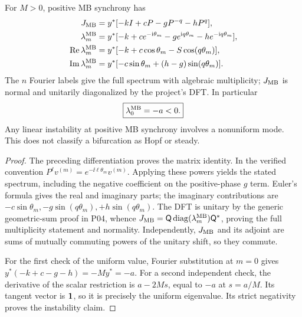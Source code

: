 \begin{theorem}
\label{thm:P08-spectrum}
For $M>0$, positive MB synchrony has
\begin{align}
 J_{\mathrm{MB}}&=y^*[-kI+cP-gP^{-q}-hP^q],\label{eq:P08-J}\\
 \lambda_m^{\mathrm{MB}}&=y^*[-k+ce^{-\mathrm{i}\theta_m}-ge^{\mathrm{i} q\theta_m}
                           -he^{-\mathrm{i} q\theta_m}],\label{eq:P08-spectrum}\\
 \operatorname{Re}\lambda_m^{\mathrm{MB}}&=y^*[-k+c\cos\theta_m-S\cos(q\theta_m)],
 \label{eq:P08-real}\\
 \operatorname{Im}\lambda_m^{\mathrm{MB}}&=y^*[-c\sin\theta_m+(h-g)\sin(q\theta_m)].
 \label{eq:P08-imag}
\end{align}
The $n$ Fourier labels give the full spectrum with algebraic multiplicity;
$J_{\mathrm{MB}}$ is normal and unitarily diagonalized by the project's DFT.
In particular
\begin{equation}
 \boxed{\lambda_0^{\mathrm{MB}}=-a<0.}\label{eq:P08-uniform}
\end{equation}
Any linear instability at positive MB synchrony involves a nonuniform
mode. This does not classify a bifurcation as Hopf or steady.
\end{theorem}
\begin{proof}
The preceding differentiation proves the matrix identity. In the verified
convention $P^\ell v^{(m)}=e^{-\ii\ell\theta_m}v^{(m)}$. Applying
these powers yields the stated spectrum, including the negative
coefficient on the positive-phase $g$ term. Euler's formula gives the
real and imaginary parts; the imaginary contributions are
$-c\sin\theta_m,-g\sin(q\theta_m),+h\sin(q\theta_m)$.
The DFT is unitary by the generic geometric-sum proof in P04, whence
$J_{\mathrm{MB}}=\mathsf{Q}\operatorname{diag}(\lambda_m^{\mathrm{MB}})\mathsf{Q}^*$, proving the
full multiplicity statement and normality. Independently, $J_{\mathrm{MB}}$
and its adjoint are sums of mutually commuting powers of the unitary
shift, so they commute.

For the first check of the uniform value, Fourier substitution at $m=0$
gives $y^*(-k+c-g-h)=-My^*=-a$. For a second independent check,
the derivative of the scalar restriction is $a-2Ms$, equal to $-a$
at $s=a/M$. Its tangent vector is $\mathbf{1}$, so it is precisely the
uniform eigenvalue. Its strict negativity proves the instability claim.
\end{proof}

